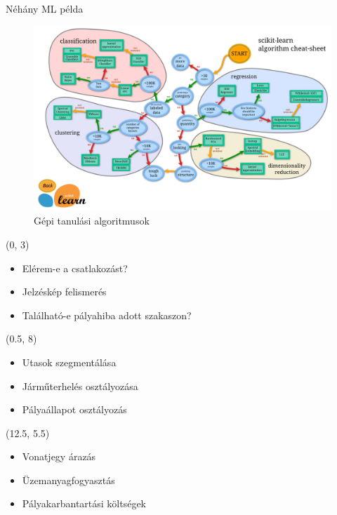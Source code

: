 \documentclass[aspectratio=169]{beamer}
\begin{document}
\begin{frame}{Néhány ML példa}
    \begin{figure}
        \centering
        \includegraphics[height=0.7\textheight]{./tex_images/ml_map.png}
        \caption*{Gépi tanulási algoritmusok\footnotemark}
    \end{figure}

    \begin{textblock}{3}(0, 3)
        \tiny
        \begin{itemize}
            \item Elérem-e a csatlakozást?
            \item Jelzéskép felismerés
            \item Található-e pályahiba adott szakaszon?
        \end{itemize}
    \end{textblock}

    \begin{textblock}{3}(0.5, 8)
        \tiny
        \begin{itemize}
            \item Utasok szegmentálása
            \item Járműterhelés osztályozása
            \item Pályaállapot osztályozás
        \end{itemize}
    \end{textblock}

    \begin{textblock}{3}(12.5, 5.5)
        \tiny
        \begin{itemize}
            \item Vonatjegy árazás
            \item Üzemanyagfogyasztás
            \item Pályakarbantartási költségek
        \end{itemize}
    \end{textblock}


\end{frame}
\end{document}

